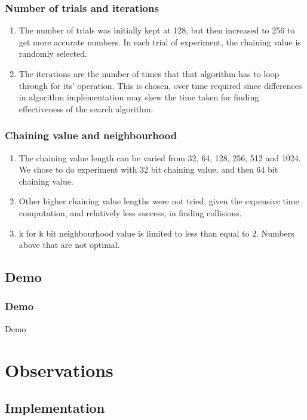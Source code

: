 \documentclass{beamer}
\begin{document}
\begin{frame}
\frametitle{Number of trials and iterations}
\begin{enumerate}
\item The number of trials was initially kept at 128, but then increased to 256 to get more accurate numbers.
In each trial of experiment, the chaining value is randomly selected.
\item The iterations are the number of times that that algorithm has to loop through for its' operation. This is
chosen, over time required since differences in algorithm implementation may skew the time taken for finding
effectiveness of the search algorithm.
\end{enumerate}
\end{frame}

\begin{frame}
\frametitle{Chaining value and neighbourhood}
\begin{enumerate}
\item The chaining value length can be varied from 32, 64, 128, 256, 512 and 1024. We chose to do experiment
with 32 bit chaining value, and then 64 bit chaining value.
\item Other higher chaining value lengths were not tried, given the expensive time computation, and relatively
less success, in finding collisions.
\item k for k bit neighbourhood value is limited to less than equal to 2. Numbers above that are not optimal. 
\end{enumerate}
\end{frame}

\subsection{Demo}
\begin{frame}
\frametitle{Demo}
Demo
\end{frame}

\section{Observations}

\subsection{Implementation}
\end{document}
